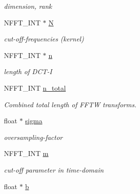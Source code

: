 \begin{DoxyCompactItemize}
\begin{DoxyCompactList}\small\item\em dimension, rank \end{DoxyCompactList}\item 
\hypertarget{structnfctf__plan_a70cc10a614a4cfb4089fec150fdcc14f}{N\-F\-F\-T\-\_\-\-I\-N\-T $\ast$ \hyperlink{structnfctf__plan_a70cc10a614a4cfb4089fec150fdcc14f}{N}}\label{structnfctf__plan_a70cc10a614a4cfb4089fec150fdcc14f}

\begin{DoxyCompactList}\small\item\em cut-\/off-\/frequencies (kernel) \end{DoxyCompactList}\item 
\hypertarget{structnfctf__plan_a03fb49e9d6e62a2445dc5dbfda619ae7}{N\-F\-F\-T\-\_\-\-I\-N\-T $\ast$ \hyperlink{structnfctf__plan_a03fb49e9d6e62a2445dc5dbfda619ae7}{n}}\label{structnfctf__plan_a03fb49e9d6e62a2445dc5dbfda619ae7}

\begin{DoxyCompactList}\small\item\em length of D\-C\-T-\/\-I \end{DoxyCompactList}\item 
N\-F\-F\-T\-\_\-\-I\-N\-T \hyperlink{structnfctf__plan_a418f1f493fd912497850d5c16c19b851}{n\-\_\-total}
\begin{DoxyCompactList}\small\item\em Combined total length of F\-F\-T\-W transforms. \end{DoxyCompactList}\item 
\hypertarget{structnfctf__plan_acfc4ccc79c6fa50199500a790cb833b2}{float $\ast$ \hyperlink{structnfctf__plan_acfc4ccc79c6fa50199500a790cb833b2}{sigma}}\label{structnfctf__plan_acfc4ccc79c6fa50199500a790cb833b2}

\begin{DoxyCompactList}\small\item\em oversampling-\/factor \end{DoxyCompactList}\item 
\hypertarget{structnfctf__plan_a683aca176483e996f3f77b6e99793d50}{N\-F\-F\-T\-\_\-\-I\-N\-T \hyperlink{structnfctf__plan_a683aca176483e996f3f77b6e99793d50}{m}}\label{structnfctf__plan_a683aca176483e996f3f77b6e99793d50}

\begin{DoxyCompactList}\small\item\em cut-\/off parameter in time-\/domain \end{DoxyCompactList}\item 
\hypertarget{structnfctf__plan_a6eb955f63212f63c0ac26894f8355caf}{float $\ast$ \hyperlink{structnfctf__plan_a6eb955f63212f63c0ac26894f8355caf}{b}}\label{structnfctf__plan_a6eb955f63212f63c0ac26894f8355caf}


\end{DoxyCompactItemize}
